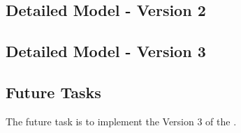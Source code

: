 \documentclass[../../main.tex]{subfiles}
\begin{document}

\subsection{Detailed Model - Version 2 \label{subsection:v2}}




\subsection{Detailed Model - Version 3 \label{subsection:v3}}







\subsection{Future Tasks}
The future task is to implement the Version 3 of the \SISM.

\end{document}
